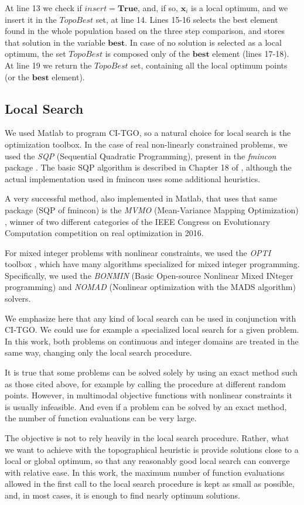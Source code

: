 At line 13 we check if $insert = \bm{True}$, and, if so, $\bm{x}_i$ is a local optimum, and we insert it in the $TopoBest$ set, at line 14. Lines 15-16 selects the best element found in the whole population based on the three step comparison, and stores that solution in the variable $\bm{best}$. In case of no solution is selected as a local optimum, the set $TopoBest$ is composed only of the $\bm{best}$ element (lines 17-18). At line 19 we return the $TopoBest$ set, containing all the local optimum points (or the $\bm{best}$ element).


\subsection{Local Search}

We used Matlab to program CI-TGO, so a natural choice for local search is the optimization toolbox. In the case of real non-linearly constrained problems, we used the \textit{SQP} (Sequential Quadratic Programming), present in the \textit{fmincon} package \citep{fmincon}. The basic SQP algorithm is described in Chapter 18 of \cite{Nocedal}, although the actual implementation used in fmincon uses some additional heuristics. 

A very successful method, also implemented in Matlab, that uses that same package (SQP of fmincon) is the \textit{MVMO} (Mean-Variance Mapping Optimization) \citep{MVMO}, winner of two different categories of the IEEE Congress on Evolutionary Computation competition on real optimization in 2016.

For mixed integer problems with nonlinear constraints, we used the \textit{OPTI} toolbox \citep{OPTI}, which have many algorithms specialized for mixed integer programming. Specifically, we used the \textit{BONMIN} (Basic Open-source Nonlinear Mixed INteger programming) \citep{BONMIN} and \textit{NOMAD} (Nonlinear optimization with the MADS algorithm) \citep{NOMAD} solvers.

We emphasize here that any kind of local search can be used in conjunction with CI-TGO. We could use for example a specialized local search for a given problem. In this work, both problems on continuous and integer domains are treated in the same way, changing only the local search procedure.

It is true that some problems can be solved solely by using an exact method such as those cited above, for example by calling the procedure at different random points. However, in multimodal objective functions with nonlinear constraints it is usually infeasible. And even if a problem can be solved by an exact method, the number of function evaluations can be very large.

The objective is not to rely heavily in the local search procedure. Rather, what we want to achieve with the topographical heuristic is provide solutions close to a local or global optimum, so that any reasonably good local search can converge with relative ease. In this work, the maximum number of function evaluations allowed in the first call to the local search procedure is kept as small as possible, and, in most cases, it is enough to find nearly optimum solutions.
